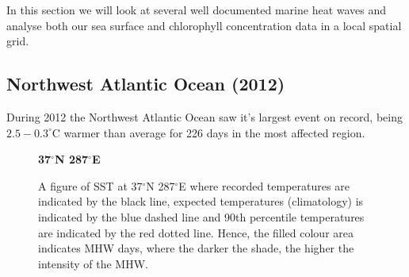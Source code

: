 In this section we will look at several well documented marine heat waves and analyse both our sea surface and chlorophyll concentration data in a local spatial grid.

\subsection{Northwest Atlantic Ocean (2012)}

During 2012 the Northwest Atlantic Ocean saw it's largest event on record, being $2.5-0.3^\circ$C warmer than average for 226 days in the most affected region.

\begin{figure}[H]
\centering
    \textbf{37$^{\circ}$N 287$^{\circ}$E}\par
            \caption{A figure of SST at 37$^{\circ}$N 287$^{\circ}$E where recorded temperatures are indicated by the black line, expected temperatures (climatology) is indicated by the blue dashed line and 90th percentile temperatures are indicated by the red dotted line. Hence, the filled colour area indicates MHW days, where the darker the shade, the higher the intensity of the MHW. \cite{MHWtracker}}
            \label{fig:NwAtlantic}
\end{figure}

